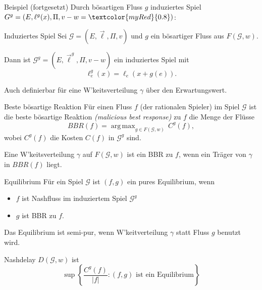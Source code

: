 \documentclass{beamer}
\DeclareMathOperator*{\argmax}{arg\,max}
\begin{document}
\begin{frame}{Beispiel (fortgesetzt)}
	Durch bösartigen Fluss $g$ induziertes Spiel $G^g = (E, \ell^g(x), \Pi, v-w = \textcolor{myRed}{0.8})$:
	\begin{figure}
	\end{figure}
\end{frame}

\begin{frame}{Induziertes Spiel}
	Sei $\mathcal G = (E, \vec{\ell}, \Pi, v)$ und $g$ ein bösartiger Fluss aus $F(\mathcal G,w)$.
	
	Dann ist $\mathcal G^g = (E, \vec{\ell}^g, \Pi, v-w)$ ein \alert{induziertes Spiel} mit 
	\[ \ell_e^g(x) = \ell_e(x+ g(e)) .\]
	
	Auch definierbar für eine W'keitsverteilung $\gamma$ über den Erwartungswert.
\end{frame}


\begin{frame}{Beste bösartige Reaktion}
	Für einen Fluss $f$ (der rationalen Spieler) im Spiel $\mathcal G$ ist die \alert{beste bösartige Reaktion} \emph{(malicious best response)} zu $f$ die Menge der Flüsse
	\[ BBR(f) = \argmax_{g \in F(\mathcal G, w)} \, C^g(f) ,\]
	wobei $C^g(f)$ die Kosten $C(f)$ in $\mathcal G^g$ sind.
	
	Eine W'keitsverteilung $\gamma$ auf $F(\mathcal G, w)$ ist ein BBR zu $f$, wenn ein Träger von $\gamma$ in $BBR(f)$ liegt.
\end{frame}

\begin{frame}{Equilibrium}
	Für ein Spiel $\mathcal G$ ist $(f, g)$ ein \alert{pures Equilibrium}, wenn 
	\begin{itemize}
		\item $f$ ist Nashfluss im induziertem Spiel $\mathcal G^g$
		\item $g$ ist BBR zu $f$.
	\end{itemize}
	
	\pause
	Das Equilibrium ist \alert{semi-pur}, wenn W'keitverteilung $\gamma$ statt Fluss $g$ benutzt wird.
	
	\pause
	Nashdelay $D(\mathcal G, w)$ ist
	\[
		\sup \left\{\frac{C^g(f)}{|f|} : (f,g) \text{ ist ein Equilibrium} \right\}
	\]
\end{frame}
\end{document}

